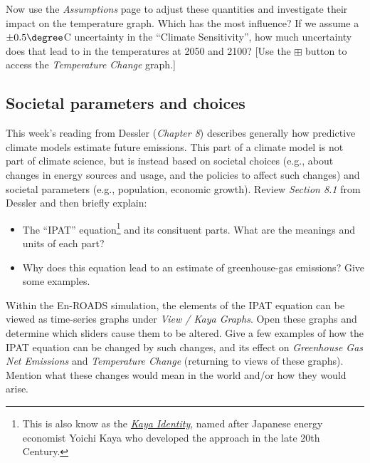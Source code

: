 \answerspace[7cm]

\noindent  Now use the {\em Assumptions} page to adjust these quantities and investigate their impact on the temperature graph.  Which has the most influence?  If we assume a $\pm 0.5\degree$C uncertainty in the ``Climate Sensitivity'', how much uncertainty does that lead to in the temperatures at 2050 and 2100? [Use the $\boxplus$ button to access the {\em Temperature Change} graph.]



\newpage
\subsection{Societal parameters and choices}

This week's reading from Dessler ({\em Chapter 8}) describes generally how predictive climate models estimate future emissions.  This part of a climate model is not part of climate science, but is instead based on societal choices (e.g., about changes in energy sources and usage, and the policies to affect such changes) and societal parameters (e.g., population, economic growth).  Review {\em Section 8.1} from Dessler and then briefly explain:
	\begin{itemize}
	\item The ``IPAT'' equation\footnote{This is also know as the \href{https://en.wikipedia.org/wiki/Kaya_identity}{\em Kaya Identity}, named after Japanese energy economist Yoichi Kaya who developed the approach in the late 20th Century.} and its consituent parts.  What are the meanings and units of each part?
	\item Why does this equation lead to an estimate of greenhouse-gas emissions?  Give some examples.  
	\end{itemize}

\answerspace[6cm]

\noindent Within the En-ROADS simulation, the elements of the IPAT equation can be viewed as time-series graphs under {\em View / Kaya Graphs}.  Open these graphs and determine which sliders cause them to be altered.  Give a few examples of how the IPAT equation can be changed by such changes, and its effect on {\em Greenhouse Gas Net Emissions} and {\em Temperature Change} (returning to views of these graphs). Mention what these changes would mean in the world and/or how they would arise.



\answerspace[6cm]

